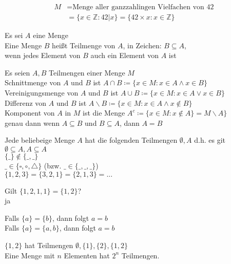 \documentclass[a4paper]{article}
\begin{document}
\begin{exercisebox}
	\begin{align*}
		M &= \text{Menge aller ganzzahlingen Vielfachen von 42}\\
		~ &= \{x \in \mathbb{Z} : 42\vert x\} = \{42\times x : x \in \mathbb{Z}\}
	\end{align*}
	\begin{definitionbox}
		Es sei $A$ eine Menge\\
		Eine Menge $B$ heißt Teilmenge von $A$, in Zeichen: $B \subseteq A$,\\
		wenn jedes Element von $B$ auch ein Element von $A$ ist
	\end{definitionbox}
	\begin{definitionbox}
		Es seien $A, B$ Teilmengen einer Menge $M$\\
		Schnittmenge von $A$ und $B$ ist $A \cap B \coloneqq \{x \in M : x\in A \wedge x \in B\}$\\
		Vereinigungsmenge von $A$ und $B$ ist $A \cup B \coloneqq \{x \in M : x\in A \vee x \in B\}$\\
		Differenz von $A$ und $B$ ist $A \backslash B \coloneqq \{x \in M : x\in A \wedge x \notin B\}$\\
		Komponent von $A$ in $M$ ist die Menge $A^c \coloneqq \{x \in M : x \notin A \} = M \backslash A\}$\\
		genau dann wenn $A \subseteq B$ und $B \subseteq A$, dann $A = B$
	\end{definitionbox}
\end{exercisebox}
Jede beliebeige Menge $A$ hat die folgenden Teilmengen $\emptyset, A$ d.h. es git $\emptyset \subseteq A,A \subseteq A$\\
$\{\_\} \notin \{\_,\_\}$\\
$\_ \in \{\square, \circ, \triangle\}$ (bzw. $\_ \in \{\_, \_, \_\}$)\\
$\{1, 2, 3\} = \{3, 2, 1\} = \{2, 1, 3\} = ...$
\begin{exercisebox}
	Gilt $\{1, 2, 1, 1\} = \{1, 2\}$?\\
	\indent\indent ja
\end{exercisebox}
\begin{exercisebox}
	Falls $\{a\} = \{b\}$, dann folgt $a = b$\\
	Falls $\{a\} = \{a, b\}$, dann folgt $a = b$
\end{exercisebox}
$\{1, 2\}$ hat Teilmengen $\emptyset, \{1\}, \{2\}, \{1, 2\}$\\
Eine Menge mit $n$ Elementen hat $2^n$ Teilmengen.
\end{document}
